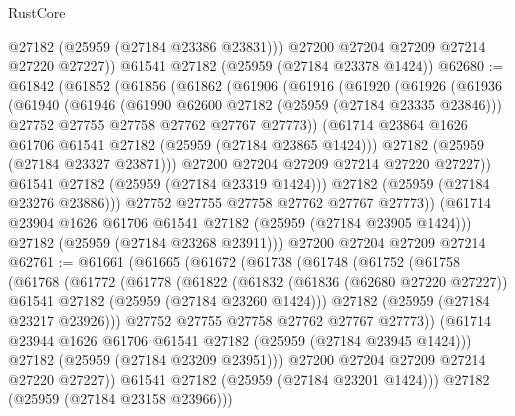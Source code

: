 \begin{lexlean}{RustCore}
\begin{coremodule}
          @27182
          (@25959 (@27184 @23386 @23831)))
        @27200
        @27204
        @27209
        @27214
        @27220
        @27227))
    @61541
    @27182
    (@25959 (@27184 @23378 @1424))
@62680 := @61842
    (@61852
      (@61856
        (@61862
          (@61906
            (@61916
              (@61920
                (@61926
                  (@61936
                    (@61940
                      (@61946
                        (@61990 @62600 @27182 (@25959 (@27184 @23335 @23846)))
                        @27752
                        @27755
                        @27758
                        @27762
                        @27767
                        @27773))
                    (@61714 @23864 @1626 @61706 @61541 @27182 (@25959 (@27184 @23865 @1424)))
                    @27182
                    (@25959 (@27184 @23327 @23871)))
                  @27200
                  @27204
                  @27209
                  @27214
                  @27220
                  @27227))
              @61541
              @27182
              (@25959 (@27184 @23319 @1424)))
            @27182
            (@25959 (@27184 @23276 @23886)))
          @27752
          @27755
          @27758
          @27762
          @27767
          @27773))
      (@61714 @23904 @1626 @61706 @61541 @27182 (@25959 (@27184 @23905 @1424)))
      @27182
      (@25959 (@27184 @23268 @23911)))
    @27200
    @27204
    @27209
    @27214
@62761 := @61661
    (@61665
      (@61672
        (@61738
          (@61748
            (@61752
              (@61758
                (@61768
                  (@61772
                    (@61778
                      (@61822
                        (@61832
                          (@61836 (@62680 @27220 @27227))
                          @61541
                          @27182
                          (@25959 (@27184 @23260 @1424)))
                        @27182
                        (@25959 (@27184 @23217 @23926)))
                      @27752
                      @27755
                      @27758
                      @27762
                      @27767
                      @27773))
                  (@61714 @23944 @1626 @61706 @61541 @27182 (@25959 (@27184 @23945 @1424)))
                  @27182
                  (@25959 (@27184 @23209 @23951)))
                @27200
                @27204
                @27209
                @27214
                @27220
                @27227))
            @61541
            @27182
            (@25959 (@27184 @23201 @1424)))
          @27182
          (@25959 (@27184 @23158 @23966)))

\end{coremodule}
\end{lexlean}
